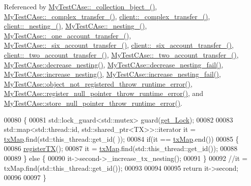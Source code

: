Referenced by \hyperlink{_my_test_c_ase_8cpp_source_l00020}{My\+Test\+C\+Ase\+::\+\_\+collection\+\_\+bject\+\_\+()}, \hyperlink{_my_test_c_ase_8cpp_source_l00126}{My\+Test\+C\+Ase\+::\+\_\+complex\+\_\+transfer\+\_\+()}, \hyperlink{client_8h_source_l00236}{client\+::\+\_\+complex\+\_\+transfer\+\_\+()}, \hyperlink{client_8h_source_l00089}{client\+::\+\_\+nesting\+\_\+()}, \hyperlink{_my_test_c_ase_8cpp_source_l00320}{My\+Test\+C\+Ase\+::\+\_\+nesting\+\_\+()}, \hyperlink{_my_test_c_ase_8cpp_source_l00074}{My\+Test\+C\+Ase\+::\+\_\+one\+\_\+account\+\_\+transfer\+\_\+()}, \hyperlink{_my_test_c_ase_8cpp_source_l00194}{My\+Test\+C\+Ase\+::\+\_\+six\+\_\+account\+\_\+transfer\+\_\+()}, \hyperlink{client_8h_source_l00170}{client\+::\+\_\+six\+\_\+account\+\_\+transfer\+\_\+()}, \hyperlink{client_8h_source_l00041}{client\+::\+\_\+two\+\_\+account\+\_\+transfer\+\_\+()}, \hyperlink{_my_test_c_ase_8cpp_source_l00266}{My\+Test\+C\+Ase\+::\+\_\+two\+\_\+account\+\_\+transfer\+\_\+()}, \hyperlink{_my_test_c_ase_8cpp_source_l00853}{My\+Test\+C\+Ase\+::decrease\+\_\+nesting()}, \hyperlink{_my_test_c_ase_8cpp_source_l00881}{My\+Test\+C\+Ase\+::decrease\+\_\+nesting\+\_\+fail()}, \hyperlink{_my_test_c_ase_8cpp_source_l00841}{My\+Test\+C\+Ase\+::increase\+\_\+nesting()}, \hyperlink{_my_test_c_ase_8cpp_source_l00868}{My\+Test\+C\+Ase\+::increase\+\_\+nesting\+\_\+fail()}, \hyperlink{_my_test_c_ase_8cpp_source_l00818}{My\+Test\+C\+Ase\+::object\+\_\+not\+\_\+registered\+\_\+throw\+\_\+runtime\+\_\+error()}, \hyperlink{_my_test_c_ase_8cpp_source_l00805}{My\+Test\+C\+Ase\+::register\+\_\+null\+\_\+pointer\+\_\+throw\+\_\+runtime\+\_\+error()}, and \hyperlink{_my_test_c_ase_8cpp_source_l00831}{My\+Test\+C\+Ase\+::store\+\_\+null\+\_\+pointer\+\_\+throw\+\_\+runtime\+\_\+error()}.


\begin{DoxyCode}
00080 \{
00081     std::lock\_guard<std::mutex> guard(\hyperlink{class_t_m_a123bc5aa0766a7b909bebc54a429e5b0_a123bc5aa0766a7b909bebc54a429e5b0}{get\_Lock});
00082 
00083     std::map<std::thread::id, std::shared\_ptr<TX>>::iterator it = \hyperlink{class_t_m_a0333dfa193ea99d7626de74a2b932e9b_a0333dfa193ea99d7626de74a2b932e9b}{txMap}.find(std::this\_thread::get\_id(
      ));
00084     \textcolor{keywordflow}{if}(it == \hyperlink{class_t_m_a0333dfa193ea99d7626de74a2b932e9b_a0333dfa193ea99d7626de74a2b932e9b}{txMap}.end())
00085     \{
00086        \hyperlink{class_t_m_a26ea481c24d9aa3aebd6dafb7253376e_a26ea481c24d9aa3aebd6dafb7253376e}{registerTX}();
00087        it = \hyperlink{class_t_m_a0333dfa193ea99d7626de74a2b932e9b_a0333dfa193ea99d7626de74a2b932e9b}{txMap}.find(std::this\_thread::get\_id());
00088        
00089     \} \textcolor{keywordflow}{else} \{
00090         it->second->\_increase\_tx\_nesting();
00091     \}
00092     \textcolor{comment}{//it = txMap.find(std::this\_thread::get\_id());}
00093     
00094 
00095     \textcolor{keywordflow}{return} it->second;
00096 
00097 \}
\end{DoxyCode}


